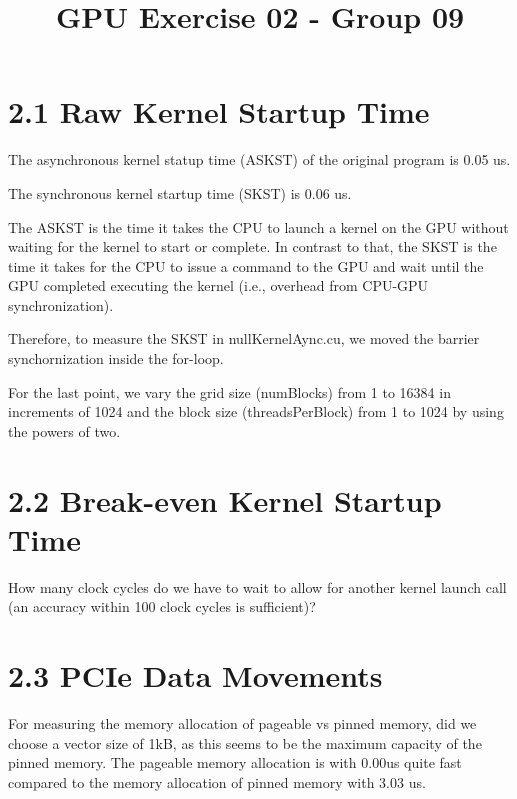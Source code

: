 \documentclass{report}
\begin{document}
\title{GPU Exercise 02 - Group 09}
\maketitle


\section*{2.1 Raw Kernel Startup Time}

The asynchronous kernel statup time (ASKST) of the original program is 0.05 us.

The synchronous kernel startup time (SKST) is 0.06 us.

The ASKST is the time it takes the CPU to launch a kernel on the GPU without waiting for the
kernel to start or complete. In contrast to that, the SKST is the time it takes for the CPU to issue a command to the GPU and wait until the GPU
completed executing the kernel (i.e., overhead from CPU-GPU synchronization).

Therefore, to measure the SKST in nullKernelAync.cu, we moved the barrier synchornization inside the for-loop.

For the last point, we vary the grid size (numBlocks) from 1 to 16384 in increments of 1024 and the block size (threadsPerBlock) from 1 to 1024 by using the powers of two.


\section*{2.2 Break-even Kernel Startup Time}


How many clock cycles do we have to wait to allow for another kernel launch call (an accuracy within 100 clock cycles is sufficient)? 


\section*{2.3 PCIe Data Movements}
For measuring the memory allocation of pageable vs pinned memory, did we choose a vector size of 1kB, as this seems to be the maximum capacity of the pinned memory.
The pageable memory allocation is with 0.00us quite fast compared to the memory allocation of pinned memory with 3.03 us.
\end{document}
